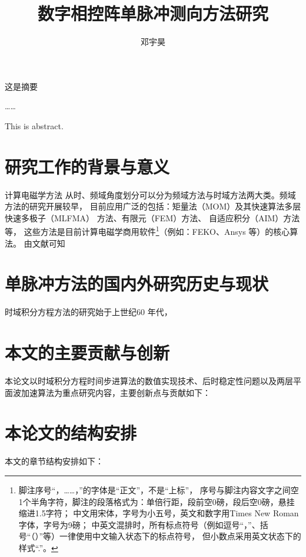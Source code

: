 \documentclass[master]{thesis-uestc}
\title{数字相控阵单脉冲测向方法研究}{The Research on Monopulse estimation with 
Digital Phased Array}
\author{邓宇昊}{Yuhao Deng}
\begin{document}
\makecover

\begin{chineseabstract}
这是摘要

……

\end{chineseabstract}

\begin{englishabstract}
This is abstract.

\end{englishabstract}

\thesistableofcontents

\thesischapterexordium

\section{研究工作的背景与意义}
计算电磁学方法
从时、频域角度划分可以分为频域方法与时域方法两大类。频域方法的研究开展较早，
目前应用广泛的包括：矩量法（MOM）及其快速算法多层快速多极子（MLFMA）
方法、有限元（FEM）方法、
自适应积分（AIM）方法等，
这些方法是目前计算电磁学商用软件\footnote{脚注序号“，……，”的字体是“正文”，不是“上标”，
序号与脚注内容文字之间空1个半角字符，脚注的段落格式为：单倍行距，段前空0磅，段后空0磅，悬挂缩进1.5字符；
中文用宋体，字号为小五号，英文和数字用Times New Roman字体，字号为9磅；
中英文混排时，所有标点符号（例如逗号“，”、括号“（）”等）一律使用中文输入状态下的标点符号，
但小数点采用英文状态下的样式“.”。}（例如：FEKO、Ansys 等）的核心算法。
由文献\cite{feng997he,clerc2010discrete,xiao2012yi}可知

\section{单脉冲方法的国内外研究历史与现状}
时域积分方程方法的研究始于上世纪60 年代，

\section{本文的主要贡献与创新}
本论文以时域积分方程时间步进算法的数值实现技术、后时稳定性问题以及两层平面波加速算法为重点研究内容，主要创新点与贡献如下：

\section{本论文的结构安排}
本文的章节结构安排如下：
\end{document}
